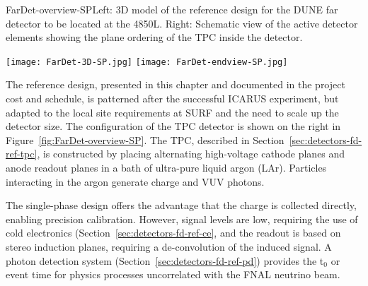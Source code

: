 \begin{cdrfigure}{FarDet-overview-SP}{Left: 3D model of the reference design for the DUNE far detector to be located at the 4850L. Right: Schematic view of the active detector elements showing the plane ordering of the TPC inside the detector.}
\centering
\begin{minipage}[b]{1.0\textwidth}
\begin{center}
\texttt{[image: FarDet-3D-SP.jpg]}
\texttt{[image: FarDet-endview-SP.jpg]}
\end{center}
\end{minipage}
\end{cdrfigure}

The reference design, presented in this chapter and documented in the project cost and schedule, is %
patterned after the successful ICARUS experiment, but adapted to the local site requirements at SURF and the need to scale up the detector size. The configuration of the TPC detector is shown on the right in Figure~\ref{fig:FarDet-overview-SP}.  The TPC, described in Section~\ref{sec:detectors-fd-ref-tpc}, is constructed by placing alternating high-voltage cathode planes and anode readout planes in a bath of ultra-pure liquid argon (LAr). Particles interacting in the argon generate charge and VUV photons. 

The single-phase design offers the advantage that the charge is collected directly, enabling precision calibration. %
However, signal levels are low, requiring the use of cold electronics (Section~\ref{sec:detectors-fd-ref-ce}, and the readout is based on stereo induction planes, requiring a de-convolution of the induced signal. A photon detection system (Section~\ref{sec:detectors-fd-ref-pd}) provides the t$_0$ or event time for physics processes uncorrelated with the FNAL neutrino beam.


